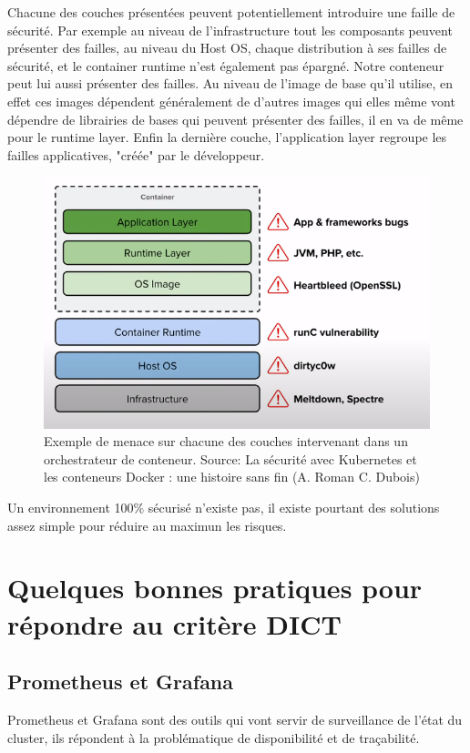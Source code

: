 \documentclass[11pt,fleqn]{book} %
\begin{document}
Chacune des couches présentées peuvent potentiellement introduire une faille de sécurité. Par exemple au niveau de l'infrastructure tout les composants peuvent présenter des failles, au niveau du Host OS, chaque distribution à ses failles de sécurité, et le container runtime n'est également pas épargné. Notre conteneur peut lui aussi présenter des failles. Au niveau de l'image de base qu'il utilise, en effet ces images dépendent généralement de d'autres images qui elles même vont dépendre de librairies de bases qui peuvent présenter des failles, il en va de même pour le runtime layer. Enfin la dernière couche, l'application layer regroupe les failles applicatives, "créée" par le développeur. 

\begin{figure}[H]\centering
\renewcommand{\figurename}{Tableau}
\includegraphics[scale=0.7]{Pictures/annexe/container-threat.PNG}
\captionsetup{margin=1.5cm,format=hang,justification=justified}
\caption[]{Exemple de menace sur chacune des couches intervenant dans un orchestrateur de conteneur. \newline
Source: La sécurité avec Kubernetes et les conteneurs Docker : une histoire sans fin (A. Roman C. Dubois)}
\end{figure}

Un environnement 100\% sécurisé n'existe pas, il existe pourtant des solutions assez simple pour réduire au maximun les risques. 

\section*{Quelques bonnes pratiques pour répondre au critère DICT}
\subsection*{Prometheus et Grafana}
Prometheus et Grafana sont des outils qui vont servir de surveillance de l'état du cluster, ils répondent à la problématique de disponibilité et de traçabilité.
\end{document}
